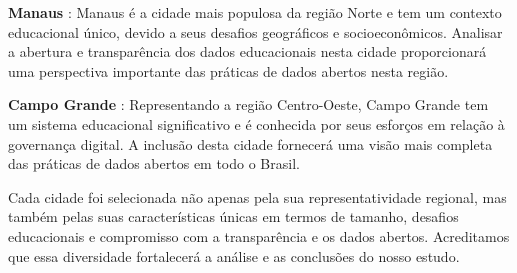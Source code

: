 \textbf{Manaus} \cite{MA}: Manaus é a cidade mais populosa da região Norte e tem um contexto educacional único, devido a seus desafios geográficos e socioeconômicos. Analisar a abertura e transparência dos dados educacionais nesta cidade proporcionará uma perspectiva importante das práticas de dados abertos nesta região.

\textbf{Campo Grande} \cite{CG}: Representando a região Centro-Oeste, Campo Grande tem um sistema educacional significativo e é conhecida por seus esforços em relação à governança digital. A inclusão desta cidade fornecerá uma visão mais completa das práticas de dados abertos em todo o Brasil.

Cada cidade foi selecionada não apenas pela sua representatividade regional, mas também pelas suas características únicas em termos de tamanho, desafios educacionais e compromisso com a transparência e os dados abertos. Acreditamos que essa diversidade fortalecerá a análise e as conclusões do nosso estudo.

